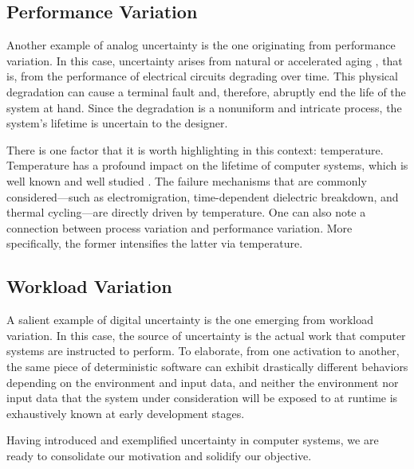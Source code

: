 \subsection{Performance Variation}

Another example of analog uncertainty is the one originating from performance
variation. In this case, uncertainty arises from natural or accelerated aging
\cite{jedec2016}, that is, from the performance of electrical circuits degrading
over time. This physical degradation can cause a terminal fault and, therefore,
abruptly end the life of the system at hand. Since the degradation is a
nonuniform and intricate process, the system's lifetime is uncertain to the
designer.

There is one factor that it is worth highlighting in this context: temperature.
Temperature has a profound impact on the lifetime of computer systems, which is
well known and well studied \cite{jedec2016}. The failure mechanisms that are
commonly considered---such as electromigration, time-dependent dielectric
breakdown, and thermal cycling---are directly driven by temperature. One can
also note a connection between process variation and performance variation. More
specifically, the former intensifies the latter via temperature.

\subsection{Workload Variation}

A salient example of digital uncertainty is the one emerging from workload
variation. In this case, the source of uncertainty is the actual work that
computer systems are instructed to perform. To elaborate, from one activation to
another, the same piece of deterministic software can exhibit drastically
different behaviors depending on the environment and input data, and neither the
environment nor input data that the system under consideration will be exposed
to at runtime is exhaustively known at early development stages.

\conclusioncut
Having introduced and exemplified uncertainty in computer systems, we are ready
to consolidate our motivation and solidify our objective.
